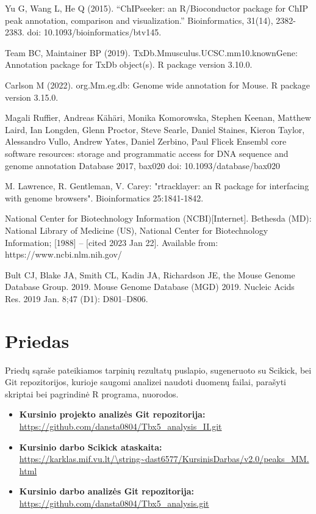 \documentclass[12pt]{article}
\begin{document}
\begin{thebibliography}{99}
 Yu G, Wang L, He Q (2015). “ChIPseeker: an R/Bioconductor
package for ChIP peak annotation, comparison and visualization.”
Bioinformatics, 31(14), 2382-2383. doi: 10.1093/bioinformatics/btv145.

 Team BC, Maintainer BP (2019).
TxDb.Mmusculus.UCSC.mm10.knownGene: Annotation package for TxDb object(s).
R package version 3.10.0.

 Carlson M (2022). org.Mm.eg.db: Genome wide annotation for
Mouse. R package version 3.15.0.

 Magali Ruffier, Andreas Kähäri, Monika Komorowska, Stephen
Keenan, Matthew Laird, Ian Longden, Glenn Proctor, Steve Searle, Daniel
Staines, Kieron Taylor, Alessandro Vullo, Andrew Yates, Daniel Zerbino, Paul
Flicek Ensembl core software resources: storage and programmatic access for DNA
sequence and genome annotation Database 2017, bax020
doi: 10.1093/database/bax020

 M. Lawrence, R. Gentleman, V. Carey: "rtracklayer: an {R}
package for interfacing with genome browsers". Bioinformatics 25:1841-1842.

 National Center for Biotechnology Information (NCBI)[Internet].
Bethesda (MD): National Library of Medicine (US), National Center for
Biotechnology Information; [1988] – [cited 2023 Jan 22]. Available from:
https://www.ncbi.nlm.nih.gov/

 Bult CJ, Blake JA, Smith CL, Kadin JA, Richardson JE, the
Mouse Genome Database Group. 2019. Mouse Genome Database (MGD) 2019.
Nucleic Acids Res. 2019 Jan. 8;47 (D1): D801–D806.
\end{thebibliography}

\newpage


\section{Priedas} \label{Priedas}

Priedų sąraše pateikiamos tarpinių rezultatų puslapio, sugeneruoto su Scikick,
bei Git repozitorijos, kurioje saugomi analizei naudoti duomenų failai,
parašyti skriptai bei pagrindinė R programa, nuorodos.

\begin{itemize}
    \item \textbf{Kursinio projekto analizės Git repozitorija:}\\
        \url{https://github.com/dansta0804/Tbx5\_analysis\_II.git}
    \item \textbf{Kursinio darbo Scikick ataskaita:}\\
        \url{https://karklas.mif.vu.lt/\string~dast6577/KursinisDarbas/v2.0/peaks\_MM.html}
    \item \textbf{Kursinio darbo analizės Git repozitorija:}\\
        \url{https://github.com/dansta0804/Tbx5\_analysis.git}
  \end{itemize}
\end{document}
